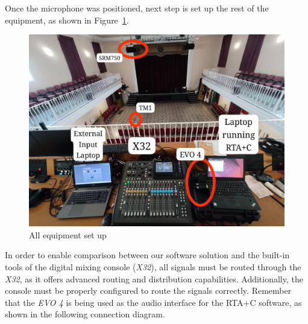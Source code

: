 Once the microphone was positioned, next step is set up the rest of the equipment, as shown in Figure~\ref{fig:Coro_setup}.

\begin{figure}[H]
	\centering
	\includegraphics[width=0.8
	\linewidth]{Figures/Coro_setup.jpeg}
	\caption{All equipment set up}
	\label{fig:Coro_setup}
\end{figure}

In order to enable comparison between our software solution and the built-in tools of the digital mixing console (\textit{X32}), all signals must be routed through the \textit{X32}, as it offers advanced routing and distribution capabilities. Additionally, the console must be properly configured to route the signals correctly. Remember that the \textit{EVO 4} is being used as the audio interface for the RTA+C software, as shown in the following connection diagram.

